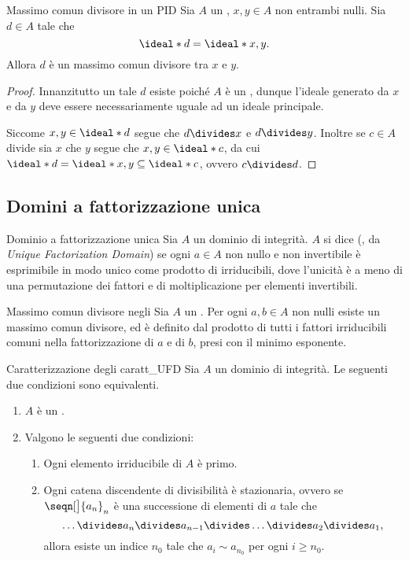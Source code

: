 \begin{proposition}
    {Massimo comun divisore in un PID}
    Sia $A$ un \PID, $x, y \in A$ non entrambi nulli. Sia $d \in A$ tale che \[
        \ideal*{d} = \ideal*{x, y}.    
    \] Allora $d$ è un massimo comun divisore tra $x$ e $y$.
\end{proposition}
\begin{proof}
    Innanzitutto un tale $d$ esiste poiché $A$ è un \PID, dunque l'ideale generato da $x$ e da $y$ deve essere necessariamente uguale ad un ideale principale.

    Siccome $x, y \in \ideal*{d}$ segue che $d \divides x$ e $d \divides y$. Inoltre se $c \in A$ divide sia $x$ che $y$ segue che $x, y \in \ideal*{c}$, da cui $\ideal*{d} = \ideal*{x, y} \subseteq \ideal*{c}$, ovvero $c \divides d$.
\end{proof}

\subsection{Domini a fattorizzazione unica}

\begin{definition}
    {Dominio a fattorizzazione unica}{}
    Sia $A$ un dominio di integrità. $A$ si dice  (\UFD, da \emph{Unique Factorization Domain}) se ogni $a \in A$ non nullo e non invertibile è esprimibile in modo unico come prodotto di irriducibili, dove l'unicità è a meno di una permutazione dei fattori e di moltiplicazione per elementi invertibili.
\end{definition}

\begin{proposition}
    {Massimo comun divisore negli \UFD}{}
    Sia $A$ un \UFD. Per ogni $a, b \in A$ non nulli esiste un massimo comun divisore, ed è definito dal prodotto di tutti i fattori irriducibili comuni nella fattorizzazione di $a$ e di $b$, presi con il minimo esponente.
\end{proposition}

\begin{theorem}
    {Caratterizzazione degli \UFD}
    {caratt_UFD}
    Sia $A$ un dominio di integrità. Le seguenti due condizioni sono equivalenti.
    \begin{enumerate}
        \item $A$ è un \UFD.
        \item Valgono le seguenti due condizioni: \begin{enumerate}[label={(\roman*)}]
            \item Ogni elemento irriducibile di $A$ è primo.
            \item Ogni catena discendente di divisibilità è stazionaria, ovvero se $\seqn[\big]{a_n}_n$ è una successione di elementi di $a$ tale che \[
                \dots \divides a_n \divides a_{n-1} \divides \dots \divides a_2 \divides a_1,    
            \] allora esiste un indice $n_0$ tale che $a_i \sim a_{n_0}$ per ogni $i \geq n_0$.
        \end{enumerate}
    \end{enumerate}
\end{theorem}

